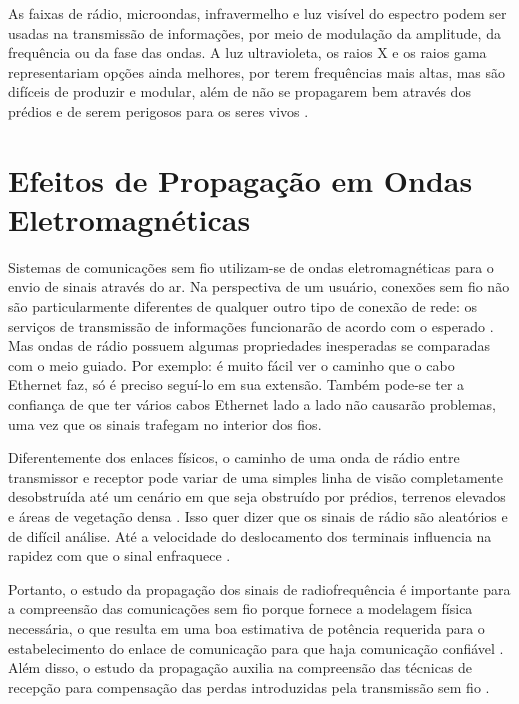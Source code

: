\begin{citacao}
	As faixas de rádio, microondas, infravermelho e luz visível do espectro podem ser usadas na transmissão de informações, por meio de modulação da amplitude, da frequência ou da fase das ondas. A luz ultravioleta, os raios X e os raios gama representariam opções ainda melhores, por terem frequências mais altas, mas são difíceis de produzir e modular, além de não se propagarem bem através dos prédios e de serem perigosos para os seres vivos \cite{tanenbaum2011}.
\end{citacao}

\section{Efeitos de Propagação em Ondas Eletromagnéticas}
\label{sec:efeitos-propagacao-OE}

Sistemas de comunicações sem fio utilizam-se de ondas eletromagnéticas para o envio de sinais através do ar. Na perspectiva de um usuário, conexões sem fio não são particularmente diferentes de qualquer outro tipo de conexão de rede: os serviços de transmissão de informações funcionarão de acordo com o esperado \cite{flickenger2008}. Mas ondas de rádio possuem algumas propriedades inesperadas se comparadas com o meio guiado.  Por exemplo: é muito fácil ver o caminho que o cabo Ethernet faz, só é preciso seguí-lo em sua extensão. Também pode-se ter a confiança de que ter vários cabos Ethernet lado a lado não causarão problemas, uma vez que os sinais trafegam no interior dos fios.

Diferentemente dos enlaces físicos, o caminho de uma onda de rádio entre transmissor e receptor pode variar de uma simples linha de visão completamente desobstruída até um cenário em que seja obstruído por prédios, terrenos elevados e áreas de vegetação densa \cite{rappaport2009}. Isso quer dizer que os sinais de rádio são aleatórios e de difícil análise. Até a velocidade do deslocamento dos terminais influencia na rapidez com que o sinal enfraquece \cite{rappaport2009}.

Portanto, o estudo da propagação dos sinais de radiofrequência é importante para a compreensão das comunicações sem fio porque fornece a modelagem física necessária, o que resulta em uma boa estimativa de potência requerida para o estabelecimento do enlace de comunicação para que haja comunicação confiável \cite{haykin2008}. Além disso, o estudo da propagação auxilia na compreensão das técnicas de recepção para compensação das perdas introduzidas pela transmissão sem fio \cite{haykin2008}.

